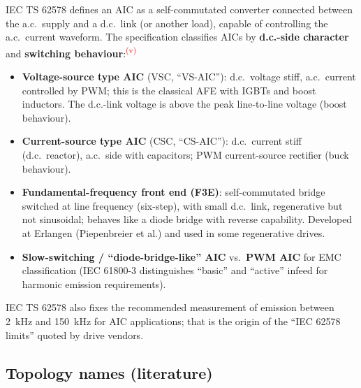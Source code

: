 \documentclass[11pt,a4paper]{article}
\newcommand{\verify}{\textsuperscript{\textcolor{red}{(v)}}}
\begin{document}
IEC TS 62578 defines an AIC as a self-commutated converter connected between the a.c.\ supply and a d.c.\ link (or another load), capable of controlling the a.c.\ current waveform. The specification classifies AICs by \textbf{d.c.-side character} and \textbf{switching behaviour}:\verify
\begin{itemize}
\item \textbf{Voltage-source type AIC} (VSC, ``VS-AIC''): d.c.\ voltage stiff, a.c.\ current controlled by PWM; this is the classical AFE with IGBTs and boost inductors. The d.c.-link voltage is above the peak line-to-line voltage (boost behaviour).
\item \textbf{Current-source type AIC} (CSC, ``CS-AIC''): d.c.\ current stiff (d.c.\ reactor), a.c.\ side with capacitors; PWM current-source rectifier (buck behaviour).
\item \textbf{Fundamental-frequency front end (F3E)}: self-commutated bridge switched at line frequency (six-step), with small d.c.\ link, regenerative but not sinusoidal; behaves like a diode bridge with reverse capability. Developed at Erlangen (Piepenbreier et al.) and used in some regenerative drives.
\item \textbf{Slow-switching / ``diode-bridge-like'' AIC} vs.\ \textbf{PWM AIC} for EMC classification (IEC 61800-3 distinguishes ``basic'' and ``active'' infeed for harmonic emission requirements).
\end{itemize}
IEC TS 62578 also fixes the recommended measurement of emission between 2~kHz and 150~kHz for AIC applications; that is the origin of the ``IEC 62578 limits'' quoted by drive vendors.

\subsection{Topology names (literature)}
\end{document}
